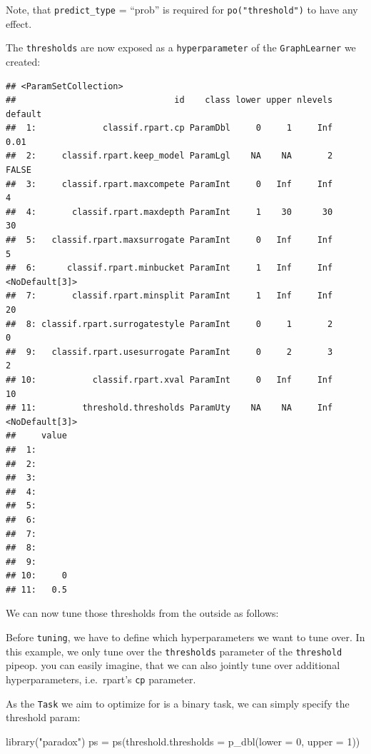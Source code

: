 \documentclass[
]{scrbook}
\newenvironment{Shaded}{\begin{snugshade}}{\end{snugshade}}
\newcommand{\AttributeTok}[1]{\textcolor[rgb]{0.77,0.63,0.00}{#1}}
\newcommand{\DecValTok}[1]{\textcolor[rgb]{0.00,0.00,0.81}{#1}}
\newcommand{\FunctionTok}[1]{\textcolor[rgb]{0.00,0.00,0.00}{#1}}
\newcommand{\NormalTok}[1]{#1}
\newcommand{\OtherTok}[1]{\textcolor[rgb]{0.56,0.35,0.01}{#1}}
\newcommand{\SpecialCharTok}[1]{\textcolor[rgb]{0.00,0.00,0.00}{#1}}
\newcommand{\StringTok}[1]{\textcolor[rgb]{0.31,0.60,0.02}{#1}}
\renewenvironment{Shaded} {\begin{snugshade}\small} {\end{snugshade}}
\begin{document}
Note, that \texttt{predict\_type} = ``prob'' is required for \texttt{po("threshold")} to have any effect.

The \texttt{thresholds} are now exposed as a \texttt{hyperparameter} of the \texttt{GraphLearner} we created:

\begin{Shaded}
\end{Shaded}

\begin{verbatim}
## <ParamSetCollection>
##                               id    class lower upper nlevels        default
##  1:             classif.rpart.cp ParamDbl     0     1     Inf           0.01
##  2:     classif.rpart.keep_model ParamLgl    NA    NA       2          FALSE
##  3:     classif.rpart.maxcompete ParamInt     0   Inf     Inf              4
##  4:       classif.rpart.maxdepth ParamInt     1    30      30             30
##  5:   classif.rpart.maxsurrogate ParamInt     0   Inf     Inf              5
##  6:      classif.rpart.minbucket ParamInt     1   Inf     Inf <NoDefault[3]>
##  7:       classif.rpart.minsplit ParamInt     1   Inf     Inf             20
##  8: classif.rpart.surrogatestyle ParamInt     0     1       2              0
##  9:   classif.rpart.usesurrogate ParamInt     0     2       3              2
## 10:           classif.rpart.xval ParamInt     0   Inf     Inf             10
## 11:         threshold.thresholds ParamUty    NA    NA     Inf <NoDefault[3]>
##     value
##  1:      
##  2:      
##  3:      
##  4:      
##  5:      
##  6:      
##  7:      
##  8:      
##  9:      
## 10:     0
## 11:   0.5
\end{verbatim}

We can now tune those thresholds from the outside as follows:

Before \texttt{tuning}, we have to define which hyperparameters we want to tune over.
In this example, we only tune over the \texttt{thresholds} parameter of the \texttt{threshold} pipeop.
you can easily imagine, that we can also jointly tune over additional hyperparameters, i.e.~rpart's \texttt{cp} parameter.

As the \texttt{Task} we aim to optimize for is a binary task, we can simply specify the threshold param:

\begin{Shaded}
\begin{Highlighting}[]
\FunctionTok{library}\NormalTok{(}\StringTok{"paradox"}\NormalTok{)}
\NormalTok{ps }\OtherTok{=} \FunctionTok{ps}\NormalTok{(}\AttributeTok{threshold.thresholds =} \FunctionTok{p\_dbl}\NormalTok{(}\AttributeTok{lower =} \DecValTok{0}\NormalTok{, }\AttributeTok{upper =} \DecValTok{1}\NormalTok{))}
\end{Highlighting}
\end{Shaded}
\end{document}
